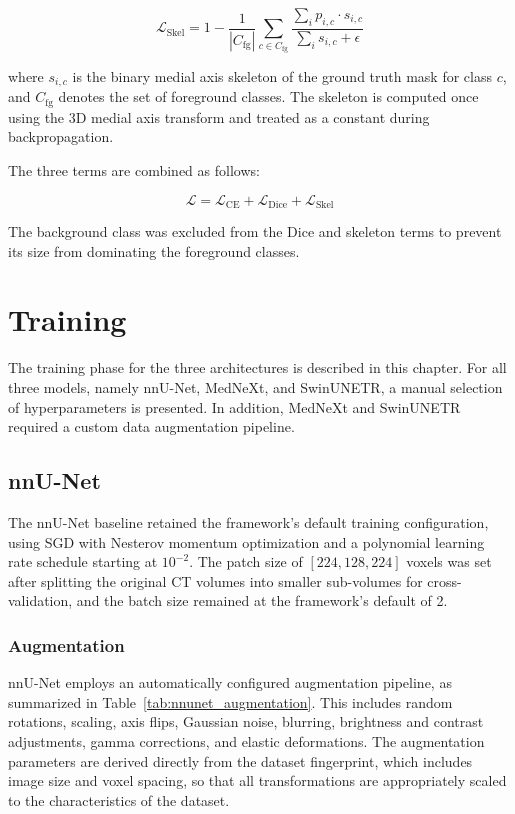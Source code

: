 \begin{equation}
\mathcal{L}_{\text{Skel}} = 1 - \frac{1}{|C_{\text{fg}}|} \sum_{c \in C_{\text{fg}}} \frac{\sum_i p_{i,c} \cdot s_{i,c}}{\sum_i s_{i,c} + \epsilon}
\label{eq:skel}
\end{equation}

where $s_{i,c}$ is the binary medial axis skeleton of the ground truth mask for class $c$, and $C_{\text{fg}}$ denotes the set of foreground classes. The skeleton is computed once using the 3D medial axis transform and treated as a constant during backpropagation.

The three terms are combined as follows:

\begin{equation}
\mathcal{L} = \mathcal{L}_{\text{CE}} + \mathcal{L}_{\text{Dice}} + \mathcal{L}_{\text{Skel}}
\label{eq:combined_loss}
\end{equation}

The background class was excluded from the Dice and skeleton terms to prevent its size from dominating the foreground classes.


\chapter{Training}

The training phase for the three architectures is described in this chapter. For all three models, namely nnU-Net, MedNeXt, and SwinUNETR, a manual selection of hyperparameters is presented. In addition, MedNeXt and SwinUNETR required a custom data augmentation pipeline.

\section{nnU-Net}

The nnU-Net baseline retained the framework's default training configuration, using SGD with Nesterov momentum optimization and a polynomial learning rate schedule starting at $10^{-2}$. The patch size of $[224, 128, 224]$ voxels was set after splitting the original CT volumes into smaller sub-volumes for cross-validation, and the batch size remained at the framework's default of 2.

\subsection{Augmentation}

nnU-Net employs an automatically configured augmentation pipeline, as summarized in Table~\ref{tab:nnunet_augmentation}. This includes random rotations, scaling, axis flips, Gaussian noise, blurring, brightness and contrast adjustments, gamma corrections, and elastic deformations. The augmentation parameters are derived directly from the dataset fingerprint, which includes image size and voxel spacing, so that all transformations are appropriately scaled to the characteristics of the dataset.

